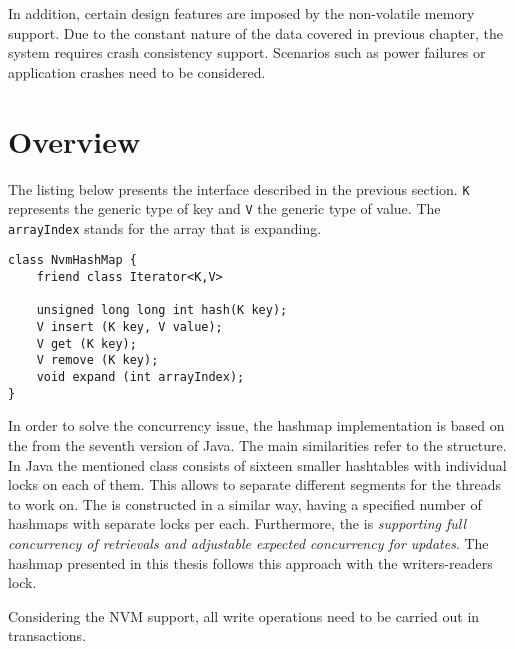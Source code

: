     In addition, certain design features are imposed by the non-volatile memory support. 
    Due to the constant nature of the data covered in previous chapter, the system requires crash consistency support.
    Scenarios such as power failures or application crashes need to be considered. 
    
    
\section{Overview}

    The listing below presents the \NvmHashMap interface described in the previous section. \texttt{K} represents the generic type of key and \texttt{V} the generic type of value. The \texttt{arrayIndex} stands for the array that is expanding.
    
\begin{lstlisting}[caption={\NvmHashMap interface}]
class NvmHashMap {
    friend class Iterator<K,V>
    
    unsigned long long int hash(K key);
    V insert (K key, V value);
    V get (K key);
    V remove (K key);
    void expand (int arrayIndex);
}
\end{lstlisting}

    In order to solve the concurrency issue, the hashmap implementation is based on the \ConcurrentHashMap from the seventh version of Java. %
    The main similarities refer to the structure.
    In Java the mentioned class consists of sixteen smaller hashtables with individual locks on each of them.
    This allows to separate different segments for the threads to work on.
    The \NvmHashMap is constructed in a similar way, having a specified number of hashmaps with separate locks per each.
    Furthermore, the \ConcurrentHashMap is \textit{supporting full concurrency of retrievals and adjustable expected concurrency for updates}. 
    The hashmap presented in this thesis follows this approach with the writers-readers lock.
    
    Considering the NVM support, all write operations need to be carried out in transactions.

    
